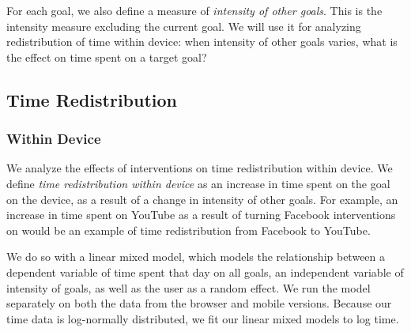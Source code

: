 For each goal, we also define a measure of \textit{intensity of other goals}. This is the intensity measure excluding the current goal. We will use it for analyzing redistribution of time within device: when intensity of other goals varies, what is the effect on time spent on a target goal?

\subsection{Time Redistribution}

\subsubsection{Within Device}

We analyze the effects of interventions on time redistribution within device. We define \textit{time redistribution within device} as an increase in time spent on the goal on the device, as a result of a change in intensity of other goals.
For example, an increase in time spent on YouTube as a result of turning Facebook interventions on would be an example of time redistribution from Facebook to YouTube.

We do so with a linear mixed model, which models the relationship between a dependent variable of time spent that day on all goals, an independent variable of intensity of goals, as well as the user as a random effect. We run the model separately on both the data from the browser and mobile versions. Because our time data is log-normally distributed, we fit our linear mixed models to log time.

